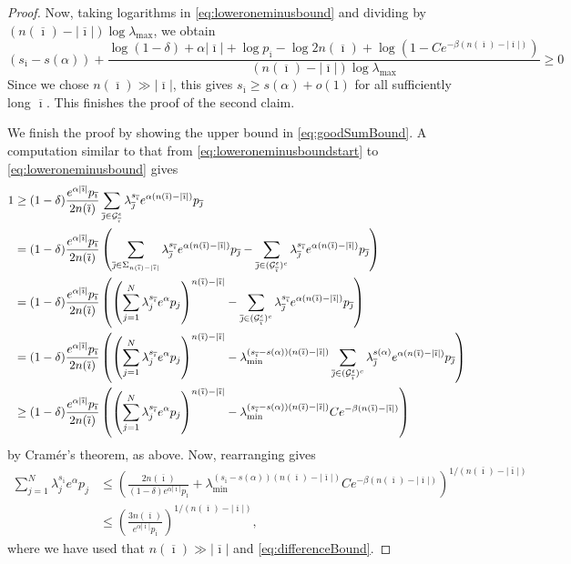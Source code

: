 \documentclass[12pt,]{article}
\theoremstyle{definition}
\theoremstyle{remark}
\newcommand{\cG}{{\cal G}}
\newcommand{\0}{\mathbf{0}}
\newcommand{\bi}{{\overline {\imath}}}
\newcommand{\bj}{{\overline  {\jmath}}}
\begin{document}
\begin{proof}
  Now, taking logarithms in \cref{eq:loweroneminusbound} and dividing by
  $(n(\bi)-|\bi|)\log\lambda_{\max}$, we obtain
  \begin{equation}
    (s_{\bi}-s(\alpha))
    +\frac{\log(1-\delta)+\alpha|\bi|+\log p_{\bi}-\log 2n(\bi)+\log(1-C
    e^{-\beta(n(\bi)-|\bi|)})}{(n(\bi)-|\bi|)\log \lambda_{\max}} \geq 0
    \label{eq:differenceBound}
  \end{equation}
  Since we chose $n(\bi) \gg |\bi|$, this gives $s_{\bi} \geq s(\alpha)+ o(1)$ for all sufficiently
  long $\bi$. This finishes the proof of the second claim.


  We finish the proof by showing the upper bound in \cref{eq:goodSumBound}.
  A computation similar to that from \cref{eq:loweroneminusboundstart} to \cref{eq:loweroneminusbound}
  gives
  \begin{align*}
    1
    &\geq
    (1-\delta)\frac{e^{\alpha|\bi|}p_{\bi}}{2n(\bi)}\sum_{\bj\in\cG_\bi^\epsilon}\lambda_{\bj}^{s_{\bi}}e^{\alpha
    (n(\bi)-|\bi|)}p_{\bj}\\
    &=
    (1-\delta)\frac{e^{\alpha|\bi|}p_{\bi}}{2n(\bi)}
    \left(\sum_{\bj\in\Sigma_{n(\bi)-|\bi|}}\lambda_{\bj}^{s_{\bi}}e^{\alpha (n(\bi)-|\bi|)}p_{\bj} -\sum_{\bj\in(\cG_\bi^\epsilon)^c}\lambda_{\bj}^{s_{\bi}}e^{\alpha (n(\bi)-|\bi|)}p_{\bj}\right)\\
    &=(1-\delta)\frac{e^{\alpha|\bi|}p_{\bi}}{2n(\bi)}\left(\left(\sum_{j=1}^N\lambda_{j}^{s_{\bi}}e^{\alpha }p_{j}\right)^{n(\bi)-|\bi|} -\sum_{\bj\in(\cG_\bi^\epsilon)^c}\lambda_{\bj}^{s_{\bi}}e^{\alpha (n(\bi)-|\bi|)}p_{\bj}\right)\\
    &=(1-\delta)\frac{e^{\alpha|\bi|}p_{\bi}}{2n(\bi)}\left(\left(\sum_{j=1}^N\lambda_{j}^{s_{\bi}}e^{\alpha }p_{j}\right)^{n(\bi)-|\bi|} -\lambda_{\min}^{(s_\bi-s(\alpha))(n(\bi)-|\bi|)}\sum_{\bj\in(\cG_\bi^\epsilon)^c}\lambda_{\bj}^{s(\alpha)}e^{\alpha (n(\bi)-|\bi|)}p_{\bj}\right)
    \\
    &\geq (1-\delta)\frac{e^{\alpha|\bi|}p_{\bi}}{2n(\bi)}\left(\left(\sum_{j=1}^N\lambda_{j}^{s_{\bi}}e^{\alpha }p_{j}\right)^{n(\bi)-|\bi|} -\lambda_{\min}^{(s_\bi-s(\alpha))(n(\bi)-|\bi|)}Ce^{-\beta(n(\bi)-|\bi|)}\right)
  \end{align*}
  by Cram\'er's theorem, as above.
  Now, rearranging gives
  \begin{align*}
    \sum_{j=1}^N\lambda_{j}^{s_{\bi}}e^{\alpha}p_{j} 
     &\leq
     \left(
       \frac{2n(\bi)}{(1-\delta)e^{\alpha|\bi|}p_{\bi}}+
       \lambda_{\min}^{(s_\bi-s(\alpha))(n(\bi)-|\bi|)}Ce^{-\beta(n(\bi)-|\bi|)}
     \right)^{1/(n(\bi)-|\bi|)}\\
     &\leq \left(
       \frac{3n(\bi)}{e^{\alpha|\bi|}p_{\bi}}
     \right)^{1/(n(\bi)-|\bi|)},
  \end{align*}
  where we have used that $n(\bi)\gg|\bi|$ and \cref{eq:differenceBound}.
\end{proof}
\end{document}
